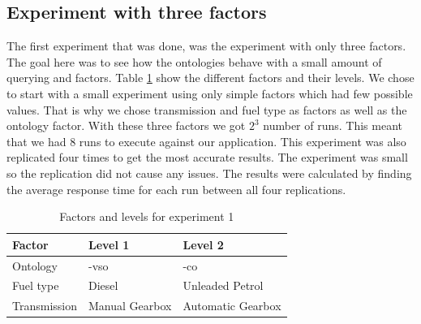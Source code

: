 \documentclass{llncs}
\begin{document}
  
\subsection{Experiment with three factors}
The first experiment that was done, was the experiment with only three factors. The goal here 
was to see how the ontologies behave with a small amount of querying and factors. 
Table \ref{facandlevExp1} show the different factors and their levels. We chose to start with a 
small experiment using only simple factors which had few possible values. That is why we chose transmission 
and fuel type as factors as well as the ontology factor. With these three factors we got $2^3$ number of runs. 
This meant that we had 8 runs to execute against our application. This experiment was also replicated 
four times to get the most accurate results. The experiment was small so the replication did not cause any issues. 
The results were calculated by finding the average response time for each run between all four replications.

\begin{table}[H]
\begin{center}
    \begin{tabular}{ | l | l l |}
    \hline
    {\bf Factor} & {\bf Level 1} & {\bf Level 2} \\ \hline
	Ontology & -vso & -co \\ \hline 
	Fuel type & Diesel & Unleaded Petrol \\ \hline 
	Transmission & Manual Gearbox & Automatic Gearbox \\ \hline 
    \end{tabular}
\end{center}
\caption{Factors and levels for experiment 1}\label{facandlevExp1}
\end{table}
\end{document}
